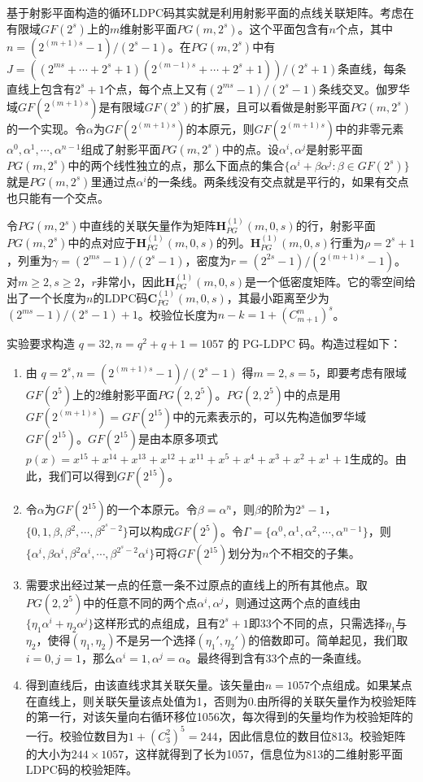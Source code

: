 \documentclass[lang=cn,11pt,a4paper,numbers]{elegantpaper}
\begin{document}
基于射影平面构造的循环LDPC码其实就是利用射影平面的点线关联矩阵。考虑在有限域$GF(2^s)$上的$m$维射影平面$PG(m,2^s)$。这个平面包含有$n$个点，其中$\displaystyle{n=(2^{(m+1)s}-1)/(2^s-1)}$。在$PG(m,2^s)$中有$\displaystyle{J=((2^{ms}+\cdots+2^s+1)(2^{(m-1)s}+\cdots+2^s+1))/(2^s+1)}$条直线，每条直线上包含有$2^s+1$个点，每个点上又有$\displaystyle{(2^{ms}-1)/(2^s-1)}$条线交叉。伽罗华域$GF(2^{(m+1)s})$是有限域$GF(2^s)$的扩展，且可以看做是射影平面$PG(m,2^s)$的一个实现。令$\alpha$为$GF(2^{(m+1)s})$的本原元，则$GF(2^{(m+1)s})$中的非零元素$\alpha^0,\alpha^1,\cdots,\alpha^{n-1}$组成了射影平面$PG(m,2^s)$中的点。设$\alpha^i,\alpha^j$是射影平面$PG(m,2^s)$中的两个线性独立的点，那么下面点的集合$\{\alpha^i+\beta\alpha^j:\beta\in GF(2^s)\}$就是$PG(m,2^s)$里通过点$\alpha^i$的一条线。两条线没有交点就是平行的，如果有交点也只能有一个交点。

令$PG(m,2^s)$中直线的关联矢量作为矩阵$\boldsymbol{H}_{PG}^{(1)}(m,0,s)$的行，射影平面$PG(m,2^s)$中的点对应于$\boldsymbol{H}_{PG}^{(1)}(m,0,s)$的列。$\boldsymbol{H}_{PG}^{(1)}(m,0,s)$行重为$\rho=2^s+1$，列重为$\displaystyle{\gamma=(2^{ms}-1)/(2^s-1)}$，密度为$\displaystyle{r=(2^{2s}-1)/(2^{(m+1)s}-1)}$。对$m\geq 2,s\geq 2$，$r$非常小，因此$\boldsymbol{H}_{PG}^{(1)}(m,0,s)$是一个低密度矩阵。它的零空间给出了一个长度为$n$的LDPC码$\boldsymbol{C}_{PG}^{(1)}(m,0,s)$，其最小距离至少为$(2^{ms}-1)/(2^s-1)+1$。校验位长度为$n-k=1+(C_{m+1}^m)^s$。

实验要求构造 $q=32, n=q^2+q+1=1057$ 的 PG-LDPC 码。构造过程如下：
\begin{enumerate}[1)]
    \item 由 $\displaystyle{q=2^s, n=(2^{(m+1)s}-1)/(2^s-1)}$ 得$m=2,s=5$，即要考虑有限域$GF(2^5)$上的2维射影平面$PG(2,2^5)$。$PG(2,2^5)$中的点是用$GF(2^{(m+1)s})=GF(2^{15})$中的元素表示的，可以先构造伽罗华域$GF(2^{15})$。$GF(2^{15})$是由本原多项式$p(x)=x^{15}+x^{14}+x^{13}+x^{12}+x^{11}+x^5+x^4+x^3+x^2+x^1+1$生成的。由此，我们可以得到$GF(2^{15})$。
    \item 令$\alpha$为$GF(2^{15})$的一个本原元。令$\beta=\alpha^n$，则$\beta$的阶为$2^s-1$，$\{0,1,\beta,\beta^2,\cdots,\beta^{2^s-2}\}$可以构成$GF(2^5)$。令$\Gamma = \{\alpha^0,\alpha^1,\alpha^2,\cdots,\alpha^{n-1}\}$，则$\{\alpha^i,\beta\alpha^i,\beta^2\alpha^i,\cdots,\beta^{2^s-2}\alpha^i\}$可将$GF(2^{15})$划分为$n$个不相交的子集。
    \item 需要求出经过某一点的任意一条不过原点的直线上的所有其他点。取$PG(2,2^5)$中的任意不同的两个点$\alpha^i,\alpha^j$，则通过这两个点的直线由$\{\eta_1\alpha^i+\eta_2\alpha^j\}$这样形式的点组成，且有$2^s+1$即33个不同的点，只需选择$\eta_1$与$\eta_2$，使得$(\eta_1,\eta_2)$不是另一个选择$(\eta_1',\eta_2')$的倍数即可。简单起见，我们取$i=0,j=1$，那么$\alpha^i=1,\alpha^j=\alpha$。最终得到含有33个点的一条直线。
    \item 得到直线后，由该直线求其关联矢量。该矢量由$n=1057$个点组成。如果某点在直线上，则关联矢量该点处值为1，否则为0.由所得的关联矢量作为校验矩阵的第一行，对该矢量向右循环移位1056次，每次得到的矢量均作为校验矩阵的一行。校验位数目为$1+(C_3^2)^5=244$，因此信息位的数目位813。校验矩阵的大小为$244\times 1057$，这样就得到了长为1057，信息位为813的二维射影平面LDPC码的校验矩阵。
\end{enumerate}
\end{document}
